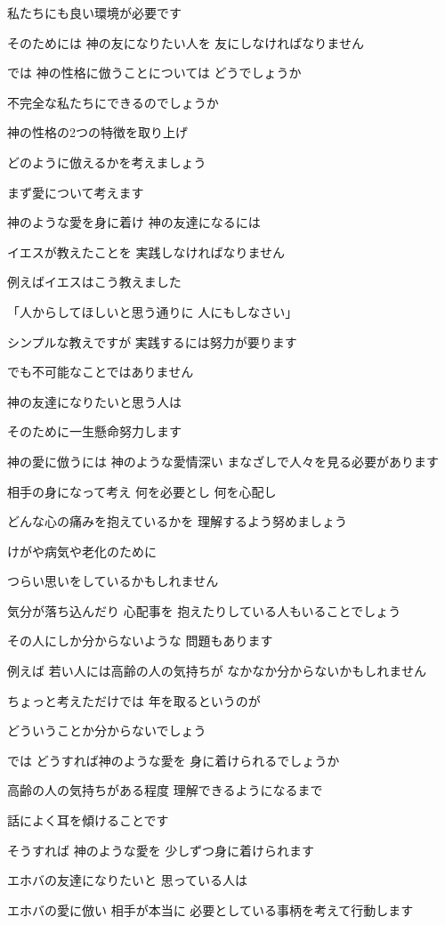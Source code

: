 \documentclass[twocolumn]{jsarticle}
\begin{document}
私たちにも良い環境が必要です

そのためには 神の友になりたい人を
友にしなければなりません

では 神の性格に倣うことについては
どうでしょうか

不完全な私たちにできるのでしょうか

神の性格の2つの特徴を取り上げ

どのように倣えるかを考えましょう

まず愛について考えます

神のような愛を身に着け
神の友達になるには

イエスが教えたことを
実践しなければなりません

例えばイエスはこう教えました

「人からしてほしいと思う通りに
人にもしなさい」

シンプルな教えですが
実践するには努力が要ります

でも不可能なことではありません

神の友達になりたいと思う人は

そのために一生懸命努力します

神の愛に倣うには 神のような愛情深い
まなざしで人々を見る必要があります

相手の身になって考え
何を必要とし 何を心配し

どんな心の痛みを抱えているかを
理解するよう努めましょう

けがや病気や老化のために

つらい思いをしているかもしれません

気分が落ち込んだり 心配事を
抱えたりしている人もいることでしょう

その人にしか分からないような
問題もあります

例えば 若い人には高齢の人の気持ちが
なかなか分からないかもしれません

ちょっと考えただけでは
年を取るというのが

どういうことか分からないでしょう

では どうすれば神のような愛を
身に着けられるでしょうか

高齢の人の気持ちがある程度
理解できるようになるまで

話によく耳を傾けることです

そうすれば 神のような愛を
少しずつ身に着けられます

エホバの友達になりたいと
思っている人は

エホバの愛に倣い 相手が本当に
必要としている事柄を考えて行動します
\end{document}

